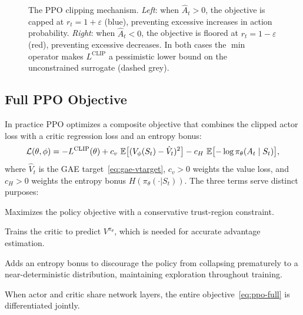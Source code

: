 \begin{figure}[ht]
\caption{The PPO clipping mechanism.  \emph{Left}: when $\hat{A}_t > 0$, the
objective is capped at $r_t = 1+\varepsilon$ (blue), preventing excessive
increases in action probability.  \emph{Right}: when $\hat{A}_t < 0$, the
objective is floored at $r_t = 1-\varepsilon$ (red), preventing excessive
decreases.  In both cases the $\min$ operator makes $L^{\mathrm{CLIP}}$ a
pessimistic lower bound on the unconstrained surrogate (dashed grey).}
\label{fig:ppo-clip}
\end{figure}

\subsection{Full PPO Objective}

In practice PPO optimizes a composite objective that combines the clipped
actor loss with a critic regression loss and an entropy bonus:
\begin{equation}
\label{eq:ppo-full}
\mathcal{L}(\theta, \phi)
= -L^{\mathrm{CLIP}}(\theta)
  + c_v\,\operatorname{\mathbb{E}}\bigl[(V_\phi(S_t) - \hat{V}_t)^2\bigr]
  - c_H\,\operatorname{\mathbb{E}}\bigl[-\log\pi_\theta(A_t \mid S_t)\bigr],
\end{equation}
where $\hat{V}_t$ is the GAE target~\eqref{eq:gae-vtarget}, $c_v > 0$
weights the value loss, and $c_H > 0$ weights the entropy bonus
$H(\pi_\theta({\cdot}|S_t))$.  The three terms serve distinct purposes:
\begin{description}[leftmargin=!, labelwidth=3.5cm]
  \item[$-L^{\mathrm{CLIP}}$] Maximizes the policy objective with a
    conservative trust-region constraint.
  \item[$c_v\,L^{\mathrm{VF}}$] Trains the critic to predict
    $V^{\pi_\theta}$, which is needed for accurate advantage estimation.
  \item[$-c_H\,H$] Adds an entropy bonus to discourage the policy from
    collapsing prematurely to a near-deterministic distribution,
    maintaining exploration throughout training.
\end{description}
When actor and critic share network layers, the entire
objective~\eqref{eq:ppo-full} is differentiated jointly.

